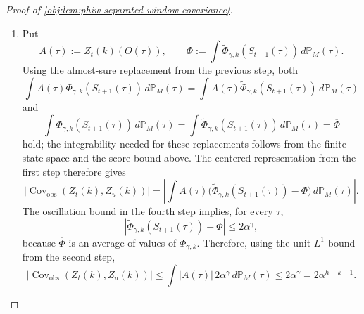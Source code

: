 \begin{proof}[Proof of \cref{obj:lem:phiw-separated-window-covariance}]
\begin{enumerate}
\item Put
\[
A(\tau):=Z_t(k)(O(\tau)),
\qquad
\overline\Phi:=
\int \widetilde\Phi_{\gamma,k}(S_{t+1}(\tau))\,d\mathbb P_M(\tau).
\]
Using the almost-sure replacement from the previous step, both
\[
\int A(\tau)\Phi_{\gamma,k}(S_{t+1}(\tau))\,d\mathbb P_M(\tau)
=
\int A(\tau)\widetilde\Phi_{\gamma,k}(S_{t+1}(\tau))\,d\mathbb P_M(\tau)
\]
and
\[
\int \Phi_{\gamma,k}(S_{t+1}(\tau))\,d\mathbb P_M(\tau)
=
\int \widetilde\Phi_{\gamma,k}(S_{t+1}(\tau))\,d\mathbb P_M(\tau)
=
\overline\Phi
\]
hold; the integrability needed for these replacements follows from the finite state space and the score bound above. The centered representation from the first step therefore gives
\[
\left|\operatorname{Cov}_{\mathrm{obs}}(Z_t(k),Z_u(k))\right|
=
\left|
\int A(\tau)\bigl(\widetilde\Phi_{\gamma,k}(S_{t+1}(\tau))-\overline\Phi\bigr)
\,d\mathbb P_M(\tau)
\right|.
\]
The oscillation bound in the fourth step implies, for every \(\tau\),
\[
\left|\widetilde\Phi_{\gamma,k}(S_{t+1}(\tau))-\overline\Phi\right|
\le 2\alpha^\gamma,
\]
because \(\overline\Phi\) is an average of values of \(\widetilde\Phi_{\gamma,k}\). Therefore, using the unit \(L^1\) bound from the second step,
\[
\left|\operatorname{Cov}_{\mathrm{obs}}(Z_t(k),Z_u(k))\right|
\le
\int |A(\tau)|\,2\alpha^\gamma\,d\mathbb P_M(\tau)
\le
2\alpha^\gamma
=
2\alpha^{h-k-1}.
\] %
\end{enumerate}
\end{proof}
